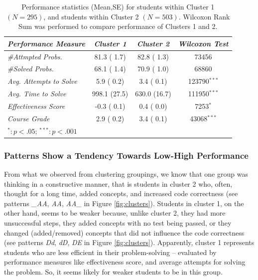 \documentclass{sigchi}
\begin{document}
\begin{table}[thb]
\centering
\begin{tabular}{@{}lccc@{}}
\small\textit{Performance Measure}  & \small\textit{Cluster 1} & \small\textit{Cluster 2} & \small\textit{Wilcoxon Test} \\
\midrule
\small\textit{\#Attmpted Probs.} & 81.3 ( 1.7) & 82.8 ( 1.3) & \num{73456} \\
\small\textit{\#Solved Probs.} & 68.1 ( 1.4) & 70.9 ( 1.0) & \num{68860} \\
\small\textit{Avg. Attempts to Solve} & 5.9 ( 0.2) & 3.4 ( 0.1) & \num{123790}$^{\ast\ast\ast}$\\
\small\textit{Avg. Time to Solve} & 998.1 (27.5) & 630.0 (16.7) & \num{111950}$^{\ast\ast\ast}$\\
\small\textit{Effectiveness Score} & -0.3 ( 0.1) & 0.4 ( 0.0) & \num{7253}$^{\ast}$\\
\small\textit{Course Grade} & 2.9 ( 0.2) & 3.4 ( 0.1) & \num{43068}$^{\ast\ast\ast}$ \\ \midrule
\multicolumn{4}{l}{\footnotesize $^{\ast}:p<.05$; \;\;\; $^{\ast\ast\ast}:p<.001$}
\end{tabular}
\caption{Performance statistics (Mean,SE) for students within Cluster 1 $(N=295)$, and students within Cluster 2 $(N=503)$. Wilcoxon Rank Sum was performed to compare performance of Clusters 1 and  2.}\vspace{-5pt}
\label{table:perfcompare}
\end{table}

\subsubsection{Patterns Show a Tendency Towards Low-High Performance}
From what we observed from clustering groupings, we know that one group was thinking in a constructive manner, that is students in cluster 2 who, often, thought for a long time, added concepts, and increased code correctness (see patterns \textit{{\_}AA}, \textit{AA}, \textit{AA{\_}} in Figure \ref{fig:clusters}). Students in cluster 1, on the other hand, seems to be weaker because, unlike cluster 2, they had more unsuccessful steps, they added concepts with no test being passed, or they changed (added/removed) concepts that did not influence the code correctness (see patterns \textit{Dd}, \textit{dD}, \textit{DE} in Figure \ref{fig:clusters}). Apparently, cluster 1 represents students who are less efficient in their problem-solving -- evaluated by performance measures like effectiveness score, and average attempts for solving the problem. So, it seems likely for weaker students to be in this group. 
\end{document}
